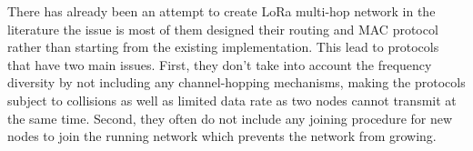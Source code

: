 There has already been an attempt to create LoRa multi-hop network in the
literature the issue is most of them designed their routing and MAC protocol
rather than starting from the existing implementation.
This lead to protocols that have two main issues.
First, they don't take into account the frequency diversity by
not including any channel-hopping mechanisms, making the protocols subject to
collisions as well as limited data rate as two nodes cannot transmit at the same time.
Second, they often do not include any joining procedure
for new nodes to join the running network which prevents the network from growing.

